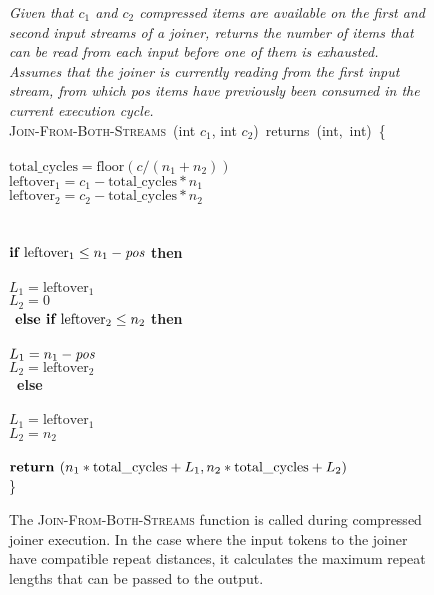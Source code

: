 \begin{figure}[t!]
\centering
\begin{minipage}{0.75\textwidth}
{\it Given that $c_1$ and $c_2$ compressed items are available on the
  first and second input streams of a joiner, returns the number of
  items that can be read from each input before one of them is
  exhausted.  Assumes that the joiner is currently reading from the
  first input stream, from which \mbox{pos} items have previously been
  consumed in the current execution cycle.}\\
\textsc{Join-From-Both-Streams}~(int $c_1$, int $c_2$)~returns~(int,~int)~\{\\
\\
 $\mbox{total\_cycles} = \mbox{floor}(c/(n_1 + n_2))$\\
 $\mbox{leftover}_1 = c_1 - \mbox{total\_cycles} * n_1$\\
 $\mbox{leftover}_2 = c_2 - \mbox{total\_cycles} * n_2$\\
~ \\
\\
\tab$\mbox{\bf if~} \mbox{leftover}_1 \leq n_1 - \mbox{\it pos}$ {\bf then}\\
\tab{}\\
\tab\tab$L_1 = \mbox{leftover}_1$\\
\tab\tab$L_2 = 0$\\
\tab$\mbox{\bf~else if~} \mbox{leftover}_2 \leq n_2$ {\bf then}\\
\tab{}\\
\tab\tab$L_1 = n_1-\mbox{\it pos}$\\
\tab\tab$L_2 = \mbox{leftover}_2$\\
\tab\mbox{\bf ~else}\\
\tab{}\\
\tab\tab$L_1 = \mbox{leftover}_1$\\
\tab\tab$L_2 = n_2$\\
~ \\
\tab$\mbox{\bf return~}(n_1*\mbox{total\_cycles} + L_1, n_2*\mbox{total\_cycles} + L_2)$\\
\}
\end{minipage}
\caption[\textsc{Join-From-Both-Streams} function for compressed joiner
  execution]{The \textsc{Join-From-Both-Streams} function is called during
  compressed joiner execution.  In the case where the input tokens to
  the joiner have compatible repeat distances, it calculates the
  maximum repeat lengths that can be passed to the
  output.\protect\label{fig:join-from-both-streams}}
\end{figure}

